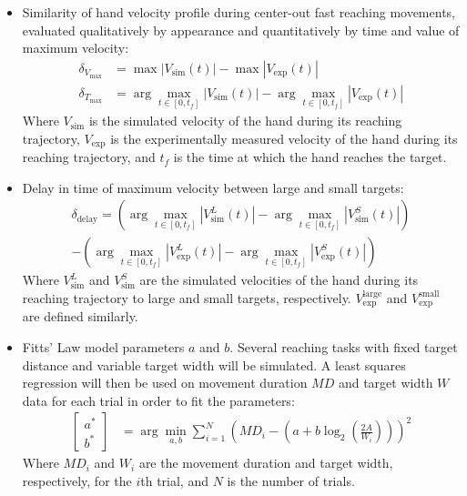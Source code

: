 \documentclass[letterpaper, 10pt, conference]{ieeeconf}
\begin{document}
\begin{itemize}
    \item Similarity of hand velocity profile during center-out fast reaching movements, evaluated qualitatively by appearance and quantitatively by time and value of maximum velocity:
    \begin{align}
        \delta_{V_{\text{max}}} &= \max \left|V_{\text{sim}}(t)\right| - \max \left|V_{\text{exp}}(t)\right| \\
        \delta_{T_{\text{max}}} &= \arg\max_{t \in [0, t_f]} \left|V_{\text{sim}}(t)\right| - \arg\max_{t \in [0, t_f]} \left|V_{\text{exp}}(t)\right|
    \end{align}
    Where $V_{\text{sim}}$ is the simulated velocity of the hand during its reaching trajectory, $V_{\text{exp}}$ is the experimentally measured velocity of the hand during its reaching trajectory, and $t_f$ is the time at which the hand reaches the target.

    \item Delay in time of maximum velocity between large and small targets:
    \begin{multline}
        \delta_{\text{delay}} = \left(\arg\max_{t \in [0, t_f]} \left|V_{\text{sim}}^{L}(t)\right| - \arg\max_{t \in [0, t_f]} \left|V_{\text{sim}}^{S}(t)\right|\right) \\
        - \left(\arg\max_{t \in [0, t_f]} \left|V_{\text{exp}}^{L}(t)\right| - \arg\max_{t \in [0, t_f]} \left|V_{\text{exp}}^{S}(t)\right|\right)
    \end{multline}
    Where $V_{\text{sim}}^{L}$ and $V_{\text{sim}}^{S}$ are the simulated velocities of the hand during its reaching trajectory to large and small targets, respectively. $V_{\text{exp}}^{\text{large}}$ and $V_{\text{exp}}^{\text{small}}$ are defined similarly.
    \item Fitts' Law model parameters $a$ and $b$.
    Several reaching tasks with fixed target distance and variable target width will be simulated. A least squares regression will then be used on movement duration $MD$ and target width $W$ data for each trial in order to fit the parameters:
    \begin{align}
        \begin{bmatrix}
            a^* \\ b^*
        \end{bmatrix} &= \arg\min_{a, b} \sum_{i=1}^N \left(MD_i - \left(a + b \log_2\left(\frac{2A}{W_i}\right)\right)\right)^2
    \end{align}
    Where $MD_i$ and $W_i$ are the movement duration and target width, respectively, for the $i$th trial, and $N$ is the number of trials.
\end{itemize}
\end{document}
